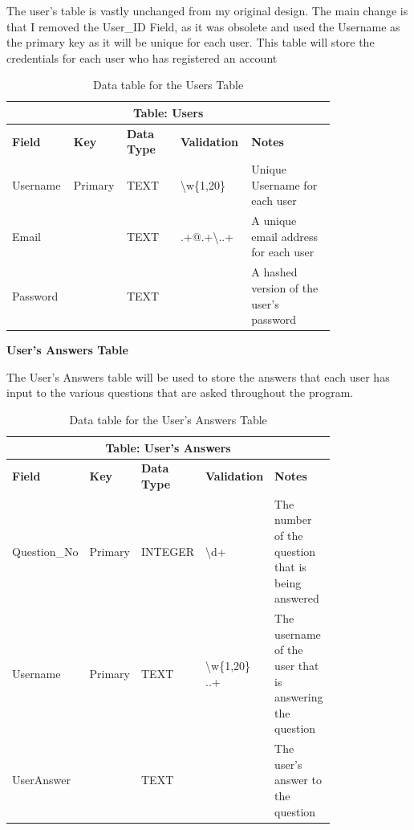 \documentclass{article}
\begin{document}
The user's table is vastly unchanged from my original design. The main change is that I removed the User\_ID Field, as it was obsolete and used the Username as the primary key as it will be unique for each user. This table will store the credentials for each user who has registered an account

\begin{table}[ht]
    \centering
    \begin{tabular}{ | p{0.15\linewidth} | p{0.1\linewidth} | p{0.16\linewidth} | p{0.14\linewidth} | p{0.25\linewidth} | }
    \hline
    \multicolumn{5}{|c|}{\textbf{Table: Users}}\\
    \hline
    \hline
    \textbf{Field} & \textbf{Key} & \textbf{Data Type} & \textbf{Validation} & \textbf{Notes} \\
    \hline
    Username & Primary & TEXT & \textbackslash w\{1,20\} & Unique Username for each user\\
    \hline
    Email & & TEXT & .+@.+\textbackslash ..+ & A unique email address for each user\\
    \hline
    Password & & TEXT & & A hashed version of the user's password\\
    \hline
    \end{tabular}
    \caption{Data table for the Users Table}
\end{table}

\textbf{User's Answers Table}

The User's Answers table will be used to store the answers that each user has input to the various questions that are asked throughout the program.


\begin{table}[ht]
    \centering
    \begin{tabular}{ | p{0.15\linewidth} | p{0.1\linewidth} | p{0.16\linewidth} | p{0.14\linewidth} | p{0.25\linewidth} | }
    \hline
    \multicolumn{5}{|c|}{\textbf{Table: User's Answers}}\\
    \hline
    \hline
    \textbf{Field} & \textbf{Key} & \textbf{Data Type} & \textbf{Validation} & \textbf{Notes} \\
    \hline
    Question\_No & Primary & INTEGER & \textbackslash d+ & The number of the question that is being answered\\
    \hline
    Username & Primary & TEXT & \textbackslash w\{1,20\} ..+ & The username of the user that is answering the question\\
    \hline
    UserAnswer & & TEXT & & The user's answer to the question\\
    \hline
    \end{tabular}
    \caption{Data table for the User's Answers Table}
\end{table}
\end{document}
